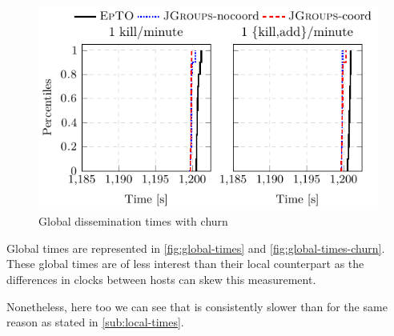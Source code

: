  \begin{figure}[hpt]
 	\centering
 	\includegraphics[width=\linewidth]{figures/global-times-synth-churn.pdf}
 	\vspace{-2mm} 
 	\caption{Global dissemination times with churn}
 	\vspace{-2mm} 
 	\label{fig:global-times-churn} 
 \end{figure}
Global times are represented in \autoref{fig:global-times} and \autoref{fig:global-times-churn}. These global times are of less interest than their local counterpart as the differences in clocks between hosts can skew this measurement.

Nonetheless, here too we can see that \epto is consistently slower than \jgroups for the same reason as stated in \autoref{sub:local-times}.
